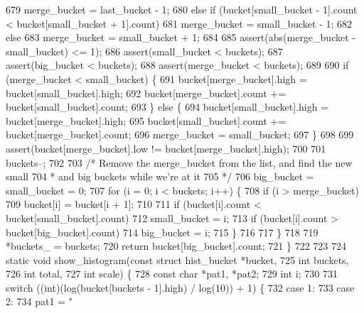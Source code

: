 \begin{DoxyCodeInclude}
{{{{{{{{{{{679       merge\_bucket = last\_bucket - 1;
680     \textcolor{keywordflow}{else} \textcolor{keywordflow}{if} (bucket[small\_bucket - 1].count < bucket[small\_bucket + 1].count)
681       merge\_bucket = small\_bucket - 1;
682     \textcolor{keywordflow}{else}
683       merge\_bucket = small\_bucket + 1;
684 
685     assert(abs(merge\_bucket - small\_bucket) <= 1);
686     assert(small\_bucket < buckets);
687     assert(big\_bucket < buckets);
688     assert(merge\_bucket < buckets);
689 
690     \textcolor{keywordflow}{if} (merge\_bucket < small\_bucket) \{
691       bucket[merge\_bucket].high = bucket[small\_bucket].high;
692       bucket[merge\_bucket].count += bucket[small\_bucket].count;
693     \} \textcolor{keywordflow}{else} \{
694       bucket[small\_bucket].high = bucket[merge\_bucket].high;
695       bucket[small\_bucket].count += bucket[merge\_bucket].count;
696       merge\_bucket = small\_bucket;
697     \}
698 
699     assert(bucket[merge\_bucket].low != bucket[merge\_bucket].high);
700 
701     buckets--;
702 
703     \textcolor{comment}{/* Remove the merge\_bucket from the list, and find the new small}
704 \textcolor{comment}{     * and big buckets while we're at it}
705 \textcolor{comment}{     */}
706     big\_bucket = small\_bucket = 0;
707     \textcolor{keywordflow}{for} (i = 0; i < buckets; i++) \{
708       \textcolor{keywordflow}{if} (i > merge\_bucket)
709         bucket[i] = bucket[i + 1];
710 
711       \textcolor{keywordflow}{if} (bucket[i].count < bucket[small\_bucket].count)
712         small\_bucket = i;
713       \textcolor{keywordflow}{if} (bucket[i].count > bucket[big\_bucket].count)
714         big\_bucket = i;
715     \}
716 
717   \}
718 
719   *buckets\_ = buckets;
720   \textcolor{keywordflow}{return} bucket[big\_bucket].count;
721 \}
722 
723 
724 \textcolor{keyword}{static} \textcolor{keywordtype}{void} show\_histogram(\textcolor{keyword}{const} \textcolor{keyword}{struct} hist\_bucket *bucket,
725                            \textcolor{keywordtype}{int}                       buckets,
726                            \textcolor{keywordtype}{int}                       total,
727                            \textcolor{keywordtype}{int}                       scale) \{
728   \textcolor{keyword}{const} \textcolor{keywordtype}{char} *pat1, *pat2;
729   \textcolor{keywordtype}{int} i;
730 
731   \textcolor{keywordflow}{switch} ((\textcolor{keywordtype}{int})(log(bucket[buckets - 1].high) / log(10)) + 1) \{
732     \textcolor{keywordflow}{case} 1:
733     \textcolor{keywordflow}{case} 2:
734       pat1 = \textcolor{stringliteral}{"%
}}}}}}}}}}}}
\end{DoxyCodeInclude}
